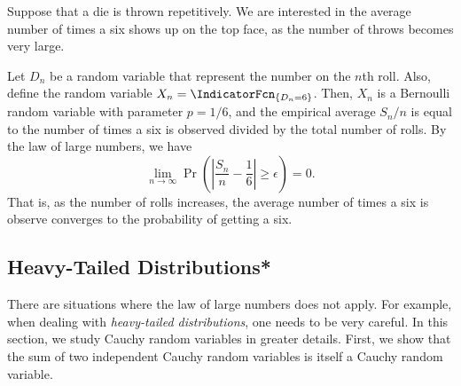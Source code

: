 \begin{example}
Suppose that a die is thrown repetitively.
We are interested in the average number of times a six shows up on the top face, as the number of throws becomes very large.

Let $D_n$ be a random variable that represent the number on the $n$th roll.
Also, define the random variable $X_n = \IndicatorFcn_{\{ D_n = 6 \}}$.
Then, $X_n$ is a Bernoulli random variable with parameter $p = 1/6$, and the empirical average $S_n / n$ is equal to the number of times a six is observed divided by the total number of rolls.
By the law of large numbers, we have
\begin{equation*}
\lim_{n \rightarrow \infty}
\Pr \left( \left| \frac{S_n}{n} - \frac{1}{6} \right| \geq \epsilon \right) = 0 .
\end{equation*}
That is, as the number of rolls increases, the average number of times a six is observe converges to the probability of getting a six.
\end{example}


\subsection{Heavy-Tailed Distributions*}

There are situations where the law of large numbers does not apply.
For example, when dealing with \emph{heavy-tailed distributions}, one needs to be very careful.
In this section, we study Cauchy random variables in greater details.
First, we show that the sum of two independent Cauchy random variables is itself a Cauchy random variable.

